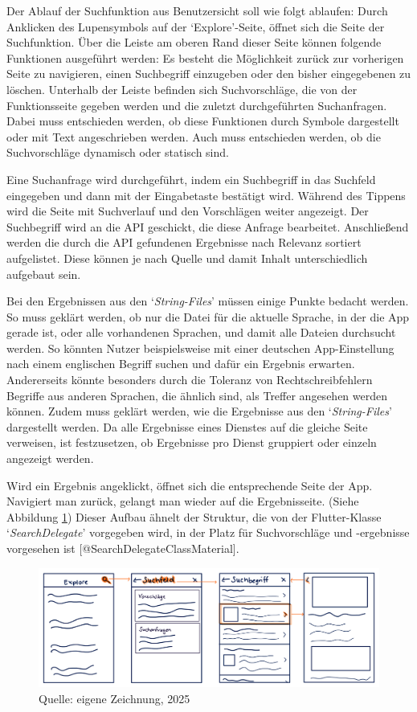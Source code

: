 \documentclass[
  12pt,
  a4paperpaper,
]{report}
\begin{document}
Der Ablauf der Suchfunktion aus Benutzersicht soll wie folgt ablaufen:
Durch Anklicken des Lupensymbols auf der `Explore'-Seite, öffnet sich
die Seite der Suchfunktion. Über die Leiste am oberen Rand dieser Seite
können folgende Funktionen ausgeführt werden: Es besteht die Möglichkeit
zurück zur vorherigen Seite zu navigieren, einen Suchbegriff einzugeben
oder den bisher eingegebenen zu löschen. Unterhalb der Leiste befinden
sich Suchvorschläge, die von der Funktionsseite gegeben werden und die
zuletzt durchgeführten Suchanfragen. Dabei muss entschieden werden, ob
diese Funktionen durch Symbole dargestellt oder mit Text angeschrieben
werden. Auch muss entschieden werden, ob die Suchvorschläge dynamisch
oder statisch sind.

Eine Suchanfrage wird durchgeführt, indem ein Suchbegriff in das
Suchfeld eingegeben und dann mit der Eingabetaste bestätigt wird.
Während des Tippens wird die Seite mit Suchverlauf und den Vorschlägen
weiter angezeigt. Der Suchbegriff wird an die API geschickt, die diese
Anfrage bearbeitet. Anschließend werden die durch die API gefundenen
Ergebnisse nach Relevanz sortiert aufgelistet. Diese können je nach
Quelle und damit Inhalt unterschiedlich aufgebaut sein.

Bei den Ergebnissen aus den `\emph{String-Files}' müssen einige Punkte
bedacht werden. So muss geklärt werden, ob nur die Datei für die
aktuelle Sprache, in der die App gerade ist, oder alle vorhandenen
Sprachen, und damit alle Dateien durchsucht werden. So könnten Nutzer
beispielsweise mit einer deutschen App-Einstellung nach einem englischen
Begriff suchen und dafür ein Ergebnis erwarten. Andererseits könnte
besonders durch die Toleranz von Rechtschreibfehlern Begriffe aus
anderen Sprachen, die ähnlich sind, als Treffer angesehen werden können.
Zudem muss geklärt werden, wie die Ergebnisse aus den
`\emph{String-Files}' dargestellt werden. Da alle Ergebnisse eines
Dienstes auf die gleiche Seite verweisen, ist festzusetzen, ob
Ergebnisse pro Dienst gruppiert oder einzeln angezeigt werden.

Wird ein Ergebnis angeklickt, öffnet sich die entsprechende Seite der
App. Navigiert man zurück, gelangt man wieder auf die Ergebnisseite.
(Siehe Abbildung \ref{fig:wireframe_1}) Dieser Aufbau ähnelt der
Struktur, die von der Flutter-Klasse `\emph{SearchDelegate}' vorgegeben
wird, in der Platz für Suchvorschläge und -ergebnisse vorgesehen ist
{[}@SearchDelegateClassMaterial{]}.

\begin{figure}
\centering
\includegraphics[width=1\linewidth,height=\textheight,keepaspectratio]{source/figures/Wireframes_ba_1.png}
\caption{Quelle: eigene Zeichnung, 2025}\label{fig:wireframe_1}
\end{figure}
\end{document}
